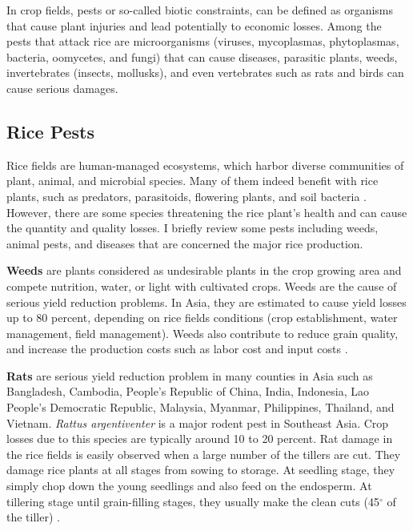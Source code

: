 \documentclass[12pt, oneside]{report}
\begin{document}
In crop fields, pests or so-called biotic constraints, can be defined as organisms that cause plant injuries and lead potentially to economic losses. Among the pests that attack rice are microorganisms (viruses, mycoplasmas, phytoplasmas, bacteria, oomycetes, and fungi) that can cause diseases, parasitic plants, weeds, invertebrates (insects, mollusks), and even vertebrates such as rats and birds can cause serious damages.

\subsection*{Rice Pests}

Rice fields are human-managed ecosystems, which harbor diverse communities of plant, animal, and microbial species. Many of them indeed benefit with rice plants, such as predators, parasitoids, flowering plants, and soil bacteria \citep{norton2010rice}. However, there are some species threatening the rice plant's health and can cause the quantity and quality losses. I briefly review some pests including weeds, animal pests, and diseases that are concerned the major rice production.


\textbf{Weeds} are plants considered as undesirable plants in the crop growing area and compete nutrition, water, or light with cultivated crops. Weeds are the cause of serious yield reduction problems. In Asia, they are estimated to cause yield losses up to 80 percent, depending on rice fields conditions (crop establishment, water management, field management). Weeds also contribute to reduce grain quality, and increase the production costs such as labor cost and input costs \citep{litsinger1991crop}.

\textbf{Rats} are serious yield reduction problem in many counties in Asia such as Bangladesh, Cambodia, People's Republic of China, India, Indonesia, Lao People's Democratic Republic, Malaysia, Myanmar, Philippines, Thailand, and Vietnam. \textit{Rattus argentiventer} is a major rodent pest in Southeast Asia. Crop losses due to this species are typically around 10 to 20 percent. Rat damage in the rice fields is easily observed when a large number of the tillers are cut. They damage rice plants at all stages from sowing to storage. At seedling stage, they simply chop down the young seedlings and also feed on the endosperm. At tillering stage until grain-filling stages, they usually make the clean cuts (45$^{\circ}$ of the tiller) \citep{singleton2003impacts}. 
\end{document}
